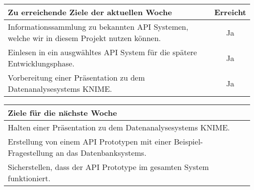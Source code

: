 \begin{tabularx}{\textwidth}{Xc}
    \arrayrulecolor{OliveGreen}
    \toprule
    {\bfseries Zu erreichende Ziele der aktuellen Woche} & {\bfseries Erreicht} \\
    \midrule[2pt]
    Informationssammlung zu bekannten API Systemen, welche wir in diesem
    Projekt nutzen können.                  &Ja                              \\
    \rowcolor{OliveGreen!15}
    Einlesen in ein ausgwähltes API System für die spätere Entwicklungsphase. &
    Ja                                                                       \\
    \rowcolor{White}
    Vorbereitung einer Präsentation zu dem Datenanalysesystems KNIME. &Ja    \\
    \bottomrule[2pt]
\end{tabularx}
%
\vspace{1cm}
%
\begin{tabularx}{\textwidth}{Xc}
    \arrayrulecolor{OliveGreen}
    \toprule
    {\bfseries Ziele für die nächste Woche}              &                   \\
    \midrule[2pt]
    Halten einer Präsentation zu dem Datenanalysesystems KNIME. &            \\
    \rowcolor{OliveGreen!15}
    Erstellung von einem API Prototypen mit einer Beispiel-Fragestellung an das
    Datenbanksystems.                              &                         \\
    \rowcolor{White}
    Sicherstellen, dass der API Prototype im gesamten System funktioniert. & \\
\end{tabularx}
